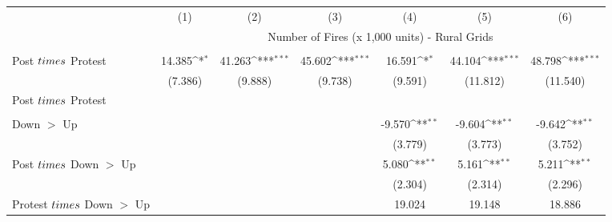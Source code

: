 {
\def\sym#1{\ifmmode^{#1}\else\(^{#1}\)\fi}
\begin{tabular}{l*{6}{c}}
\hline
            &\multicolumn{1}{c}{(1)}         &\multicolumn{1}{c}{(2)}         &\multicolumn{1}{c}{(3)}         &\multicolumn{1}{c}{(4)}         &\multicolumn{1}{c}{(5)}         &\multicolumn{1}{c}{(6)}         \\
            & \multicolumn{6}{c}{Number of Fires (x 1,000 units) - Rural Grids} \\ \hline
            &                     &                     &                     &                     &                     &                     \\

Post $\\times$ Protest&      14.385\sym{*}  &      41.263\sym{***}&      45.602\sym{***}&      16.591\sym{*}  &      44.104\sym{***}&      48.798\sym{***}\\
            &     (7.386)         &     (9.888)         &     (9.738)         &     (9.591)         &    (11.812)         &    (11.540)         \\
Post $\\times$ Protest&                     &                     &                     &                     &                     &                     \\
            &                     &                     &                     &                     &                     &                     \\
Down $>$ Up &                     &                     &                     &      -9.570\sym{**} &      -9.604\sym{**} &      -9.642\sym{**} \\
            &                     &                     &                     &     (3.779)         &     (3.773)         &     (3.752)         \\
Post $\\times$ Down $>$ Up&                     &                     &                     &       5.080\sym{**} &       5.161\sym{**} &       5.211\sym{**} \\
            &                     &                     &                     &     (2.304)         &     (2.314)         &     (2.296)         \\
Protest $\\times$ Down $>$ Up&                     &                     &                     &      19.024         &      19.148         &      18.886         \\

\end{tabular}}
